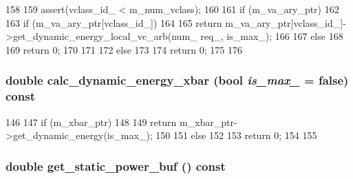 \begin{DoxyCode}
158 {
159     assert(vclass_id_ < m_num_vclass);
160 
161     if (m_va_ary_ptr)
162     {
163         if (m_va_ary_ptr[vclass_id_])
164         {
165             return m_va_ary_ptr[vclass_id_]->get_dynamic_energy_local_vc_arb(num_
      req_, is_max_);
166         }
167         else
168         {
169             return 0;
170         }
171     }
172     else
173     {
174         return 0;
175     }
176 }
\end{DoxyCode}
\hypertarget{classOrionRouter_a2981899f6e58668a49ad442d901f435b}{
\subsubsection[{calc\_\-dynamic\_\-energy\_\-xbar}]{\setlength{\rightskip}{0pt plus 5cm}double calc\_\-dynamic\_\-energy\_\-xbar (bool {\em is\_\-max\_\-} = {\ttfamily false}) const}}
\label{classOrionRouter_a2981899f6e58668a49ad442d901f435b}



\begin{DoxyCode}
146 {
147     if (m_xbar_ptr)
148     {
149         return m_xbar_ptr->get_dynamic_energy(is_max_);
150     }
151     else
152     {
153         return 0;
154     }
155 }
\end{DoxyCode}
\hypertarget{classOrionRouter_a4d81d81940059916f6e9ac55ba87a3db}{
\subsubsection[{get\_\-static\_\-power\_\-buf}]{\setlength{\rightskip}{0pt plus 5cm}double get\_\-static\_\-power\_\-buf () const}}
\label{classOrionRouter_a4d81d81940059916f6e9ac55ba87a3db}



